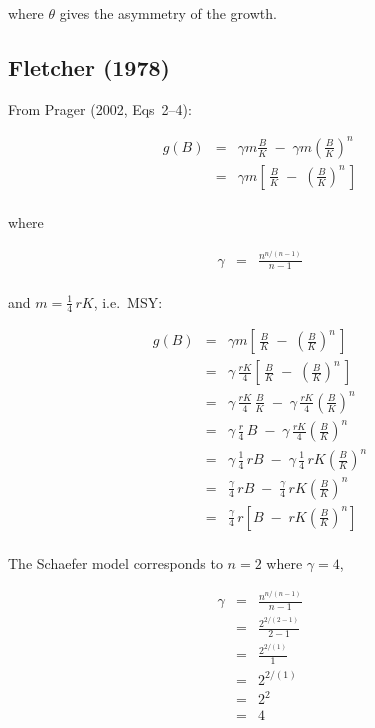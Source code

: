\documentclass[fleqn]{article}
\begin{document}
where $\theta$ gives the asymmetry of the growth.

\newpage

\subsection{Fletcher (1978)}

From Prager (2002, Eqs~2--4):

\begin{eqnarray*}
  g(B) &=& \gamma m\frac{B}{K} \;-\;
  \gamma m\left(\frac{B}{K}\right)^{\!n}     \\[1em]
  ~    &=& \gamma m\left[\,\frac{B}{K} \;-\;
    \left(\frac{B}{K}\right)^{\!\!n}\,\right]\\[1ex]
\end{eqnarray*}

where

\begin{eqnarray*}
  \gamma &=& \frac{n^{n/(n-1)}}{n-1}\\[1ex]
\end{eqnarray*}

and $m\!=\!\frac{1}{4}\,rK$, i.e.\ MSY:

\begin{eqnarray*}
  g(B) &=& \gamma m\left[\,\frac{B}{K} \;-\;
    \left(\frac{B}{K}\right)^{\!\!n}\,\right]\\[1em]
  ~    &=& \gamma\,\frac{rK}{4}\left[\,\frac{B}{K} \;-\;
    \left(\frac{B}{K}\right)^{\!\!n}\,\right]\\[1ex]
  ~    &=& \gamma\,\frac{rK}{4}\,\frac{B}{K} \;-\;
  \gamma\,\frac{rK}{4}\!\left(\frac{B}{K}\right)^{\!\!n}   \\[1em]
  ~    &=& \gamma\,\frac{r}{4}\,B \;-\;
  \gamma\,\frac{rK}{4}\!\left(\frac{B}{K}\right)^{\!\!n}   \\[1em]
  ~    &=& \gamma\,\frac{1}{4}\,rB \;-\;
  \gamma\,\frac{1}{4}\,rK\!\left(\frac{B}{K}\right)^{\!\!n}\\[1em]
  ~    &=& \frac{\gamma}{4}\,rB \;-\;
  \frac{\gamma}{4}\,rK\!\left(\frac{B}{K}\right)^{\!\!n}   \\[1em]
  ~    &=& \frac{\gamma}{4}\,r\left[B \;-\;
    rK\!\left(\frac{B}{K}\right)^{\!\!n}\right]            \\[1ex]
\end{eqnarray*}

\newpage

The Schaefer model corresponds to $n\!=\!2$ where $\gamma\!=\!4$,

\begin{eqnarray*}
  \gamma &=& \frac{n^{n/(n-1)}}{n-1}\\[1em]
  ~      &=& \frac{2^{2/(2-1)}}{2-1}\\[1em]
  ~      &=& \frac{2^{2/(1)}}{1}    \\[1em]
  ~      &=& 2^{2/(1)}              \\[1em]
  ~      &=& 2^2                    \\[1em]
  ~      &=& 4                      \\[1ex]
\end{eqnarray*}
\end{document}
